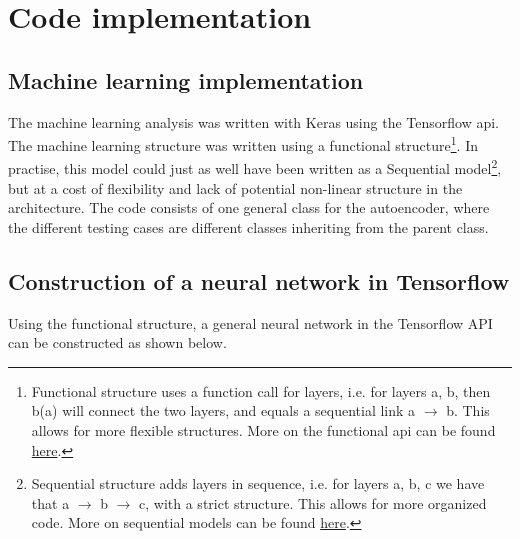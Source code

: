 \section{Code implementation}
\subsection*{Machine learning implementation}

The machine learning analysis was written with Keras\cite{chollet2015keras} using the Tensorflow api\cite{tensorflow-whitepaper}. 
The machine learning structure was written using a functional structure\footnote{Functional structure uses a function call for layers, i.e. for layers a, b, then b(a) will connect the two layers, and equals a sequential link a $\to$ b. This allows for more flexible structures. More on the functional api can be found \href{https://www.tensorflow.org/guide/keras/functional}{here}.}.
In practise, this model could just as well have been written as a Sequential model\footnote{Sequential structure adds layers in sequence, i.e. for layers a, b, c we have that a $\to$ b $\to$ c, with a strict structure. This allows for more organized code. More on sequential models can be found \href{https://www.tensorflow.org/guide/keras/sequential_model}{here}.}, 
but at a cost of flexibility and lack of potential non-linear structure in the architecture. The code consists of one general class for
 the autoencoder, where the different testing cases are different classes inheriting from the parent class.\par



\subsection*{Construction of a neural network in Tensorflow}

Using the functional structure, a general neural network in the Tensorflow API can be constructed as shown below. 

